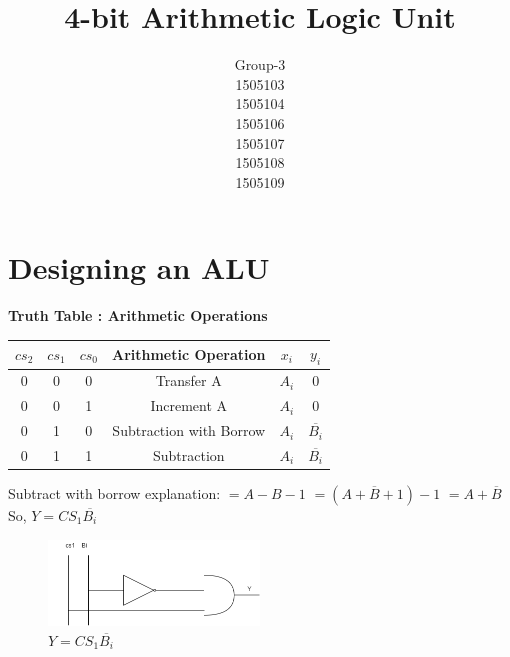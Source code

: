 \documentclass[12pt]{extarticle}
\title{4-bit Arithmetic Logic Unit}
\author{Group-3\\1505103\\1505104\\1505106\\1505107\\1505108\\1505109}
\begin{document}
	
	\maketitle
	
	\newpage
	\section{Designing an ALU}
	
	\textbf{Truth Table : Arithmetic Operations}
	\begin{center}
		\begin{tabular}{ |c|c|c|c|c|c| } 
			\hline
			$cs_2$ & $cs_1$ & $cs_0$ & Arithmetic Operation & $x_i$ & $y_i$  \\
			\hline
			
			\hline
			0 & 0 & 0 & Transfer A & $A_i$ & 0 \\
			\hline
			
			\hline
			0 & 0 & 1 & Increment A & $A_i$ & 0 \\
			\hline
			
			\hline
			0 & 1 & 0 & Subtraction with Borrow & $A_i$ & $\overline{B_i}$ \\
			\hline
			
			\hline
			0 & 1 & 1 & Subtraction & $A_i$ & $\overline{B_i}$ \\
			\hline
		\end{tabular}
	\end{center}Subtract with borrow explanation:\newline
	$=A-B-1$ \newline
	$=(A+\overline{B}+1)-1$ \newline
	$=A+\overline{B}$ \newline So, $Y=CS_1\overline{B_i}$
	\begin{figure}[h]
		\centering
		\includegraphics[width = 0.5\textwidth]{image/ckt1.png}
		\caption{
			$Y=CS_1\overline{B_i}$
		}
		\label{fig:ckt1}
		
	\end{figure}
	
\end{document}
